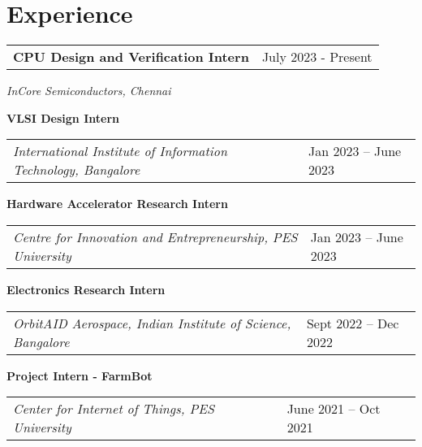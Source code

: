 \section{\sc Experience}

\begin{tabular}{@{}p{4in}p{2in}}
{\bf{CPU Design and Verification Intern}}  & July 2023 - Present \\
\end{tabular}  
    \textit{InCore Semiconductors, Chennai} 

   {\bf{VLSI Design Intern}} \\
   \begin{tabular}{@{}p{4in}p{2in}}
    \textit{International Institute of Information Technology, Bangalore}  & Jan 2023 – June 2023 \\
   \end{tabular}

   {\bf{Hardware Accelerator Research Intern}} \\
   \begin{tabular}{@{}p{4in}p{2in}}
    \textit{Centre for Innovation and Entrepreneurship, PES University}  & Jan 2023 – June 2023 \\
   \end{tabular}

   {\bf{Electronics Research Intern}} \\
   \begin{tabular}{@{}p{4in}p{2in}}
    \textit{OrbitAID Aerospace, Indian Institute of Science, Bangalore}  & Sept 2022 – Dec 2022 \\
   \end{tabular}

   {\bf{Project Intern - FarmBot}} \\
   \begin{tabular}{@{}p{4in}p{2in}}
    \textit{Center for Internet of Things, PES University}  & June 2021 – Oct 2021 \\
   \end{tabular}

   \endinput